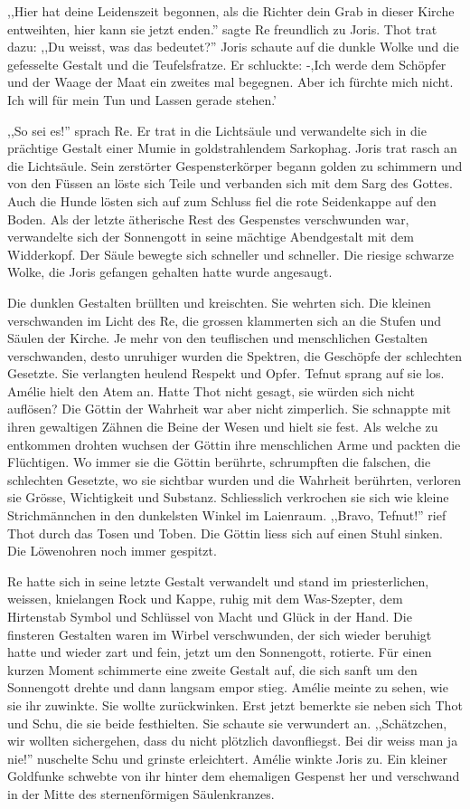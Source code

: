 \documentclass[11pt,titlepage,a5paper]{book}
\begin{document}
,,Hier hat deine Leidenszeit begonnen, als die Richter dein Grab in dieser Kirche entweihten, hier kann sie jetzt enden.'' sagte Re freundlich zu Joris. Thot trat dazu: ,,Du weisst, was das bedeutet?'' Joris schaute auf die dunkle Wolke und die gefesselte Gestalt und die Teufelsfratze. Er schluckte: -,Ich werde dem Schöpfer und der Waage der Maat ein zweites mal begegnen. Aber ich fürchte mich nicht. Ich will für mein Tun und Lassen gerade stehen.'

,,So sei es!'' sprach Re. Er trat in die Lichtsäule und verwandelte sich in die prächtige Gestalt einer Mumie in goldstrahlendem Sarkophag. Joris trat rasch an die Lichtsäule. Sein zerstörter Gespensterkörper begann golden zu schimmern und von den Füssen an löste sich Teile und verbanden sich mit dem Sarg des Gottes. Auch die Hunde lösten sich auf zum Schluss fiel die rote Seidenkappe auf den Boden. Als der letzte ätherische Rest des Gespenstes verschwunden war, verwandelte sich der Sonnengott in seine mächtige Abendgestalt mit dem Widderkopf. Der Säule bewegte sich schneller und schneller. Die riesige schwarze Wolke, die Joris gefangen gehalten hatte wurde angesaugt. 

Die dunklen Gestalten brüllten und kreischten. Sie wehrten sich. Die kleinen verschwanden im Licht des Re, die grossen klammerten sich an die Stufen und Säulen der Kirche. Je mehr von den teuflischen und menschlichen Gestalten verschwanden, desto unruhiger wurden die Spektren, die Geschöpfe der schlechten Gesetzte. Sie verlangten heulend Respekt und Opfer. Tefnut sprang auf sie los. Amélie hielt den Atem an. Hatte Thot nicht gesagt, sie würden sich nicht auflösen? Die Göttin der Wahrheit war aber nicht zimperlich. Sie schnappte mit ihren gewaltigen Zähnen die Beine der Wesen und hielt sie fest. Als welche zu entkommen drohten wuchsen der Göttin ihre menschlichen Arme und packten die Flüchtigen. Wo immer sie die Göttin berührte, schrumpften die falschen, die schlechten Gesetzte, wo sie sichtbar wurden und die Wahrheit berührten, verloren sie Grösse, Wichtigkeit und Substanz. Schliesslich verkrochen sie sich wie kleine Strichmännchen in den dunkelsten Winkel im Laienraum. ,,Bravo, Tefnut!'' rief Thot durch das Tosen und Toben. Die Göttin liess sich auf einen Stuhl sinken. Die Löwenohren noch immer gespitzt.

Re hatte sich in seine letzte Gestalt verwandelt und stand im priesterlichen, weissen, knielangen Rock und Kappe, ruhig mit dem Was-Szepter, dem Hirtenstab Symbol und Schlüssel von Macht und Glück in der Hand. Die finsteren Gestalten waren im Wirbel verschwunden, der sich wieder beruhigt hatte und wieder zart und fein, jetzt um den Sonnengott, rotierte. Für einen kurzen Moment schimmerte eine zweite Gestalt auf, die sich sanft um den Sonnengott drehte und dann langsam empor stieg. Amélie meinte zu sehen, wie sie ihr zuwinkte. Sie wollte zurückwinken. Erst jetzt bemerkte sie neben sich Thot und Schu, die sie beide festhielten. Sie schaute sie verwundert an. ,,Schätzchen, wir wollten sichergehen, dass du nicht plötzlich davonfliegst. Bei dir weiss man ja nie!'' nuschelte Schu und grinste erleichtert. Amélie winkte Joris zu. Ein kleiner Goldfunke schwebte von ihr hinter dem ehemaligen Gespenst her und verschwand in der Mitte des sternenförmigen Säulenkranzes.
\end{document}
